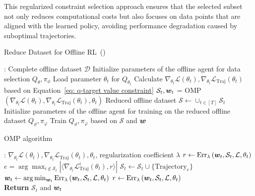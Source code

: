 This regularized constraint selection approach ensures that the selected subset not only reduces computational costs but also focuses on data points that are aligned with the learned policy, avoiding performance degradation caused by suboptimal trajectories.

\begin{algorithm}[t]
    \caption{Reduce Dataset for Offline RL~(\name)}
    \label{alg: offline data selection}
    \begin{algorithmic}[1]
        : Complete offline dataset $\mathcal{D}$
        \STATE Initialize parameters of the offline agent for data selection $Q_{\theta}, \pi_{\phi}$
        \STATE Load parameter $\theta_t$ for $Q_{\theta_t}$
        \STATE Calculate $\nabla_{\theta_t}\mathcal{L}(\theta_t), \nabla_{\theta_t}\mathcal L_{\text{Traj}}(\theta_t)$ based on Equation~\ref{eq: q-target value constraint}
        \STATE $\mathcal{S}_{t}, {\bm{w}}_{t}$ = OMP$(\nabla_{\theta_t}\mathcal{L}(\theta_t), \nabla_{\theta_t}\mathcal L_{\text{Traj}}(\theta_t), \theta_t)$
        \ENDFOR
    \STATE Reduced offline dataset $\mathcal S\leftarrow\cup_{t\in[T]}\mathcal S_t$
    \STATE Initialize parameters of the offline agent for training on the reduced offline dataset $Q_{\vartheta},\pi_{\varphi}$
    \STATE Train $Q_{\vartheta},\pi_{\varphi}$ based on $\mathcal{S}$ and ${\bm{w}}$
    \end{algorithmic}
\end{algorithm}

\begin{algorithm}[t]
    \caption{OMP algorithm}
    \label{alg: omp}
    \begin{algorithmic}[1]
        : $\nabla_{\theta_t}\mathcal{L}(\theta_t), \nabla_{\theta_t}\mathcal L_{\text{Traj}}(\theta_t), \theta_t$, regularization coefficient $\lambda$
        \STATE $r\leftarrow\operatorname{Err}_{\lambda}\left({\bm{w}}_t, \mathcal{S}_t, \mathcal L, \theta_t\right)$
        \STATE $e=\arg\max_{i\notin\mathcal{S}_t}|\langle\nabla_{\theta_t}\mathcal L_{\text{Traj}}^i(\theta_t), r\rangle|$
        \STATE $\mathcal{S}_t\leftarrow\mathcal{S}_t\cup\{\text{Trajectory}_e\}$
        \STATE ${\bm{w}}_t\leftarrow\arg\min_{{\bm{w}}_t}\operatorname{Err}_{\lambda}\left({\bm{w}}_t, \mathcal{S}_t, \mathcal L, \theta_t\right)$
        \STATE $r\leftarrow\operatorname{Err}_{\lambda}\left({\bm{w}}_t, \mathcal{S}_t, \mathcal L, \theta_t\right)$
        \ENDWHILE\\
    \STATE \textbf{Return} $\mathcal{S}_t$ and ${\bm{w}}_t$
    \end{algorithmic}
\end{algorithm}


